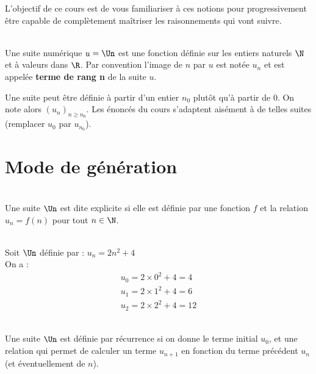 \documentclass[12pt,fleqn]{report} %
\begin{document}
L'objectif de ce cours est de vous familiariser à ces notions pour progressivement être capable de complètement maîtriser les raisonnements qui vont suivre. \\ 



\begin{definition}\text{ }\\
	Une suite numérique $u = \Un$ est une fonction définie sur les entiers naturels $\N$ et à valeurs dans $\R$. Par convention l'image de $n$ par $u$ est notée $u_n$ et est appelée \textbf{terme de rang n} de la suite $u$.
\end{definition}

\begin{remark}
	Une suite peut être définie à partir d'un entier $n_0$ plutôt qu'à partir de 0. On note alors $(u_n)_{n\geq n_0}$. Les énoncés du cours s'adaptent aisément à de telles suites (remplacer $u_0$ par $u_{n_0}$).
\end{remark}

\section{Mode de génération}

\begin{definition}\text{ }\\
	Une suite $\Un$ est dite explicite si elle est définie par une fonction $f$ et la relation $u_n = f(n)$ pour tout $n\in \N$.
\end{definition}

\begin{example}\text{ }\\
	Soit $\Un$ définie par : $u_n = 2 n^2 + 4$ \\
	On a :\begin{align*}
	u_0 = 2 \times 0^2 + 4 = 4 \\
	u_1 = 2 \times 1^2 + 4 = 6 \\
	u_2 = 2 \times 2^2 + 4 = 12
	\end{align*}
	
\end{example}

\begin{definition}\text{ }\\
	Une suite $\Un$ est définie par récurrence si on donne le terme initial $u_0$, et une relation qui permet de calculer un terme $u_{n+1}$ en fonction du terme précédent $u_n$ (et éventuellement de $n$).
\end{definition}
\end{document}
